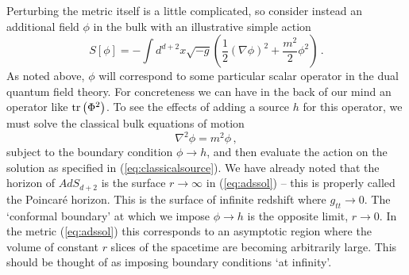 \documentclass[10pt, oneside]{book}
\def\be{\begin{equation}}
\def\ee{\end{equation}}
\newcommand{\tr}{{\rm tr} }
\begin{document}
\begin{doublespace}
Perturbing the metric itself is a little complicated, so consider instead an additional field $\phi$ in the bulk with an illustrative simple action
\be\label{eq:phi}
S[\phi] = -\int d^{d+2}x \sqrt{-g}\left(\frac{1}{2} \left(\nabla \phi \right)^2 + \frac{m^2}{2} \phi^2 \right) \,.
\ee
As noted above, $\phi$ will correspond to some particular scalar operator in the dual quantum field theory. For concreteness we can have in the back of our mind an operator like $\tr\left(\Phi^2\right)$. To see the effects of adding a source $h$ for this operator, we must solve the classical bulk equations of motion
\be\label{eq:scalarwave}
\nabla^2 \phi = m^2 \phi \,,
\ee
subject to the boundary condition $\phi \to h$, and then evaluate the action on the solution as specified in (\ref{eq:classicalsource}). We have already noted that the horizon of $AdS_{d+2}$ is the surface $r \to \infty$ in (\ref{eq:adssol}) -- this is properly called the Poincar\'e horizon. This is the surface of infinite redshift where $g_{tt} \to 0$. The `conformal boundary' at which we impose $\phi \to h$ is the opposite limit, $r \to 0$. In the metric (\ref{eq:adssol}) this corresponds to an asymptotic region where the volume of constant $r$ slices of the spacetime are becoming arbitrarily large. This should be thought of as imposing boundary conditions `at infinity'.


\end{doublespace}
\end{document}
